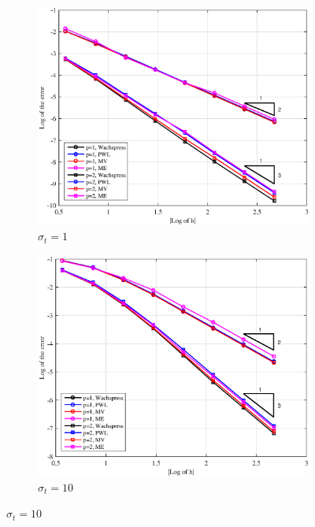 \begin{figure}
\centering
{
	\begin{subfigure}[b]{0.485\textwidth}
		\centering
		\label{subfig::PA_Left_SplitPoly_sig1}
		\includegraphics[width=\textwidth]{figures/sec_BF/PAErr_Left_SplitPoly_sig1.eps}
	\caption{$\sigma_t = 1$}
	\end{subfigure}
	\hfill
	\begin{subfigure}[b]{0.485\textwidth}
		\centering
		\label{subfig::PA_Left_SplitPoly_sig10}
		\includegraphics[width=\textwidth]{figures/sec_BF/PAErr_Left_SplitPoly_sig10.eps}
	\caption{$\sigma_t = 10$}

\end{subfigure}}
\end{figure}

